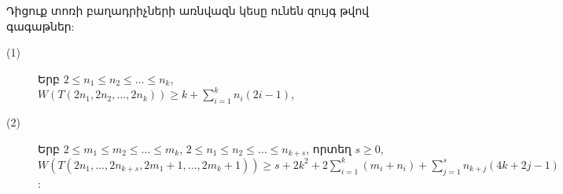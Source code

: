 \begin{theorem}
\label{t2_n_torus}
Դիցուք տոռի բաղադրիչների առնվազն կեսը ունեն զույգ թվով գագաթներ:
\begin{description}
\item[(1)] Երբ $2 \leq n_1 \leq n_2 \leq \ldots \leq n_k$,\\
$W\left( {T(2{n_1},2{n_2},\ldots,2{n_k})} \right) \ge k + \sum\limits_{i = 1}^k {{n_i}(2i-1)}$,

\item[(2)] Երբ $2 \leq m_1 \leq m_2 \leq \ldots \leq m_k$, $2 \leq n_1 \leq n_2 \leq \ldots \leq n_{k+s}$, որտեղ $s\geq 0$,\\ 
$W\left( {T(2{n_1},\ldots,2{n_{k + s}},2{m_1} + 1,\ldots,2{m_k} + 1)} \right) \ge s + 2k^2 + 2\sum\limits_{i=1}^{k}{\left(m_i+n_i\right)} + \sum\limits_{j=1}^{s}{n_{k+j}(4k+2j-1)} $:
\end{description}
\end{theorem}
